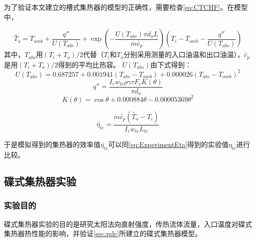 为了验证本文建立的槽式集热器的模型的正确性，需要检查\autoref{eq:CTCHF}。在模型中，

\begin{equation}
	\widetilde{T_{o}}=T_{amb} + \dfrac{q''}{U(T_{abs})} + \exp(-\frac{U(T_{abs})\pi d_o L}{\dot{m}\widetilde{c_p}})(T_{i}-T_{amb}-\dfrac{q''}{U(T_{abs})})
	\label{eq:CheckT_o}
\end{equation}
其中，$T_{abs}$用$(T_i + T_o)/2$代替（$T_i$和$T_o$分别采用测量的入口油温和出口油温），$\widetilde{c_p}$是用$(T_i + T_o)/2$得到的平均比热容。
$U(T_{abs})$由下式得到\cite{Romero2012}：
\begin{equation}
	U(T_{abs}) = 0.687257 + 0.001941(T_{abs} - T_{amb}) + 0.000026(T_{abs} - T_{amb})^2
	\label{eq:U_T_abs}
\end{equation}
\begin{equation}
	q'' = \frac{I_r w_{tc} \rho \gamma \tau F_e K(\theta)}{\pi d_o}
\end{equation}
\begin{equation}
	K(\theta) = \cos\theta+0.000884\theta-0.00005369\theta^2
\end{equation}

\begin{equation}
	\widetilde{\eta_{tc}} = \dfrac{\dot{m}\widetilde{c_p}(\widetilde{T_o}-T_i)}{I_rw_{tc}L_{tc}}
\end{equation}

于是模拟得到的集热器的效率值$\widetilde{\eta_{tc}}$可以同\autoref{eq:ExperimentEta}得到的实验值$\eta_{tc}$进行比较。

	
\subsection{碟式集热器实验}
\subsubsection{实验目的}
碟式集热器实验的目的是研究太阳法向直射强度，传热流体流量，入口温度对碟式集热器热性能的影响，并验证\autoref{sec:pdc}所建立的碟式集热器模型。

